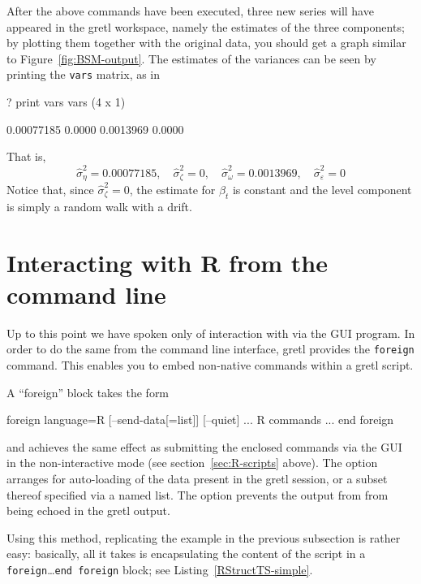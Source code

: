 After the above commands have been executed, three new series will
have appeared in the gretl workspace, namely the estimates of
the three components; by plotting them together with the original
data, you should get a graph similar to
Figure~\ref{fig:BSM-output}. The estimates of the variances can be
seen by printing the \texttt{vars} matrix, as in

\begin{code}
? print vars
vars (4 x 1)

  0.00077185 
      0.0000 
   0.0013969 
      0.0000 
\end{code}

That is,
\begin{equation*}
  \hat{\sigma}^2_{\eta} = 0.00077185, \quad
  \hat{\sigma}^2_{\zeta} = 0, \quad
  \hat{\sigma}^2_{\omega} = 0.0013969, \quad
  \hat{\sigma}^2_{\varepsilon} = 0
\end{equation*}
Notice that, since $\hat{\sigma}^2_{\zeta} = 0$, the estimate for
$\beta_t$ is constant and the level component is simply a random walk
with a drift.

\section{Interacting with R from the command line}
\label{sec:foreign-command}

Up to this point we have spoken only of interaction with  via
the GUI program. In order to do the same from the command line
interface, gretl provides the \texttt{foreign} command. This
enables you to embed non-native commands within a gretl
script.

A ``foreign'' block takes the form
\begin{code}
foreign language=R [--send-data[=list]] [--quiet]
    ... R commands ...
end foreign
\end{code}
and achieves the same effect as submitting the enclosed 
commands via the GUI in the non-interactive mode (see
section~\ref{sec:R-scripts} above). The  option
arranges for auto-loading of the data present in the gretl session, or
a subset thereof specified via a named list.  The 
option prevents the output from  from being echoed in the gretl
output.

Using this method, replicating the example in the previous subsection
is rather easy: basically, all it takes is encapsulating the content
of the  script in a \texttt{foreign}\ldots\texttt{end foreign}
block; see Listing~\ref{RStructTS-simple}.

